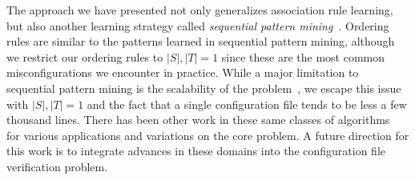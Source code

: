 The approach we have presented not only generalizes association rule learning, but also another learning strategy called \textit{sequential pattern mining}~\cite{mabroukeh2010taxonomy}. Ordering rules are similar to the patterns learned in sequential pattern mining, although we restrict our ordering rules to $|S|,|T|=1$ since these are the most common misconfigurations we encounter in practice.
While a major limitation to sequential pattern mining is the scalability of the problem~\cite{ayres2002sequential}, we escape this issue with $|S|,|T|=1$ and the fact that a single configuration file tends to be less a few thousand lines.
There has been other work in these same classes of algorithms~\cite{han2007frequent,langley1995applications} for various applications and variations on the core problem.
A future direction for this work is to integrate advances in these domains into the configuration file verification problem.
